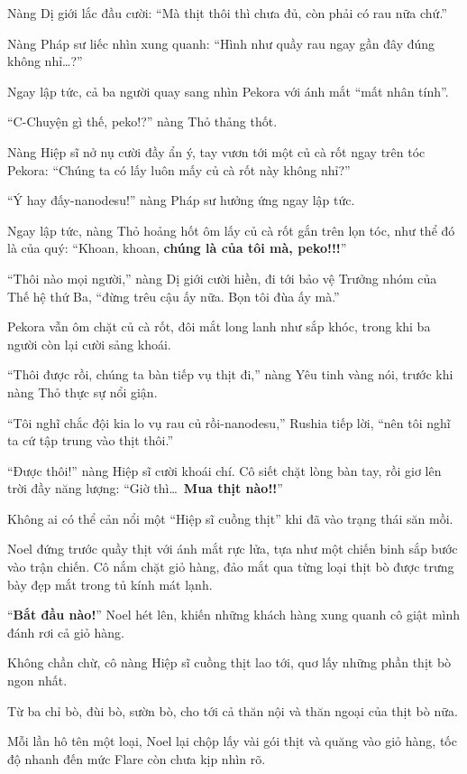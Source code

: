\documentclass[../main.tex]{subfiles}
\begin{document}
Nàng Dị giới lắc đầu cười: ``Mà thịt thôi thì chưa đủ, còn phải có rau nữa chứ.''

Nàng Pháp sư liếc nhìn xung quanh: ``Hình như quầy rau ngay gần đây đúng không nhỉ\dots?''

Ngay lập tức, cả ba người quay sang nhìn Pekora với ánh mắt ``mất nhân tính''.

``C-Chuyện gì thế, peko!?'' nàng Thỏ thảng thốt.

Nàng Hiệp sĩ nở nụ cười đầy ẩn ý, tay vươn tới một củ cà rốt ngay trên tóc Pekora: ``Chúng ta có lấy luôn mấy củ cà rốt này không nhỉ?''

``Ý hay đấy-nanodesu!'' nàng Pháp sư hưởng ứng ngay lập tức.

Ngay lập tức, nàng Thỏ hoảng hốt ôm lấy củ cà rốt gắn trên lọn tóc, như thể đó là của quý: ``Khoan, khoan, \textbf{chúng là của tôi mà, peko!!!}''

``Thôi nào mọi người,'' nàng Dị giới cười hiền, đi tới bảo vệ Trưởng nhóm của Thế hệ thứ Ba, ``đừng trêu cậu ấy nữa. Bọn tôi đùa ấy mà.''

Pekora vẫn ôm chặt củ cà rốt, đôi mắt long lanh như sắp khóc, trong khi ba người còn lại cười sảng khoái.

``Thôi được rồi, chúng ta bàn tiếp vụ thịt đi,'' nàng Yêu tinh vàng nói, trước khi nàng Thỏ thực sự nổi giận.

``Tôi nghĩ chắc đội kia lo vụ rau củ rồi-nanodesu,'' Rushia tiếp lời, ``nên tôi nghĩ ta cứ tập trung vào thịt thôi.''

``Được thôi!'' nàng Hiệp sĩ cười khoái chí. Cô siết chặt lòng bàn tay, rồi giơ lên trời đầy năng lượng: ``Giờ thì\dots\ \textbf{Mua thịt nào!!}''

Không ai có thể cản nổi một ``Hiệp sĩ cuồng thịt'' khi đã vào trạng thái săn mồi.

\ct

Noel đứng trước quầy thịt với ánh mắt rực lửa, tựa như một chiến binh sắp bước vào trận chiến. Cô nắm chặt giỏ hàng, đảo mắt qua từng loại thịt bò được trưng bày đẹp mắt trong tủ kính mát lạnh.

``\textbf{Bắt đầu nào!}'' Noel hét lên, khiến những khách hàng xung quanh cô giật mình đánh rơi cả giỏ hàng.

Không chần chừ, cô nàng Hiệp sĩ cuồng thịt lao tới, quơ lấy những phần thịt bò ngon nhất.

Từ ba chỉ bò, đùi bò, sườn bò, cho tới cả thăn nội và thăn ngoại của thịt bò nữa.

Mỗi lần hô tên một loại, Noel lại chộp lấy vài gói thịt và quăng vào giỏ hàng, tốc độ nhanh đến mức Flare còn chưa kịp nhìn rõ.
\end{document}
